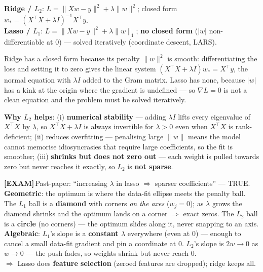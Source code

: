 \documentclass[11pt, a4paper]{article}
\newcommand{\examflag}{\textcolor{tipBd}{\textbf{[EXAM]}}\,}
\newcommand{\kw}[1]{\textbf{#1}}
\begin{document}
\begin{defbox}
\kw{Ridge / $L_2$}: $L=\|Xw-y\|^2+\lambda\|w\|^2$; closed form
$w_\ast=(X^\top X+\lambda I)^{-1}X^\top y$. \\
\kw{Lasso / $L_1$}: $L=\|Xw-y\|^2+\lambda\|w\|_1$; \kw{no closed form} ($|w|$ non-differentiable at
$0$) — solved iteratively (coordinate descent, LARS).
\end{defbox}

Ridge has a closed form because its penalty $\|w\|^2$ is smooth: differentiating the loss and
setting it to zero gives the linear system $(X^\top X+\lambda I)w_\ast=X^\top y$, the normal
equation with $\lambda I$ added to the Gram matrix. Lasso has none, because $|w|$ has a kink at the
origin where the gradient is undefined — so $\nabla L=0$ is not a clean equation and the problem
must be solved iteratively.

\kw{Why $L_2$ helps}: (i) \kw{numerical stability} — adding $\lambda I$ lifts every eigenvalue of
$X^\top X$ by $\lambda$, so $X^\top X+\lambda I$ is always invertible for $\lambda>0$ even when
$X^\top X$ is rank-deficient; (ii) reduces overfitting — penalising large $\|w\|$ means the model
cannot memorise idiosyncrasies that require large coefficients, so the fit is smoother; (iii)
\kw{shrinks but does not zero out} — each weight is pulled towards zero but never reaches it
exactly, so $L_2$ is \kw{not sparse}.

\begin{trapbox}
\examflag{}Past-paper: ``increasing $\lambda$ in lasso $\Rightarrow$ sparser coefficients'' — TRUE. \\
\kw{Geometric}: the optimum is where the data-fit ellipse meets the penalty ball. The $L_1$ ball is a
\kw{diamond} with corners \emph{on the axes} ($w_j=0$); as $\lambda$ grows the diamond shrinks and
the optimum lands on a corner $\Rightarrow$ exact zeros. The $L_2$ ball is a \kw{circle} (no corners)
— the optimum slides along it, never snapping to an axis. \\
\kw{Algebraic}: $L_1$'s slope is a \kw{constant $\lambda$} everywhere (even at $0$) — enough to
cancel a small data-fit gradient and pin a coordinate at $0$. $L_2$'s slope is $2w\to0$ as $w\to0$ —
the push fades, so weights shrink but never reach $0$. \\
$\Rightarrow$ Lasso does \kw{feature selection} (zeroed features are dropped); ridge keeps all.
\end{trapbox}
\end{document}
